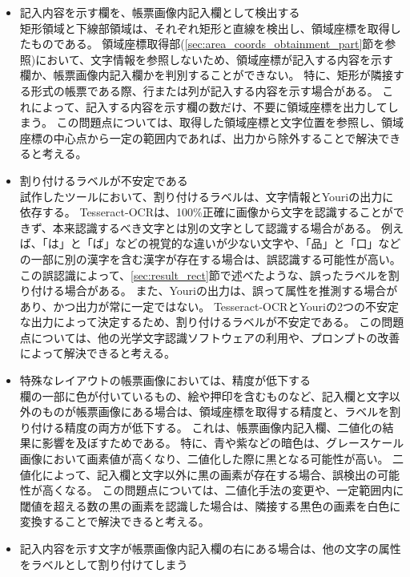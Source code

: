 \begin{itemize}
    \item 記入内容を示す欄を、帳票画像内記入欄として検出する\\
        矩形領域と下線部領域は、それぞれ矩形と直線を検出し、領域座標を取得したものである。
        領域座標取得部(\ref{sec:area_coords_obtainment_part}節を参照)において、文字情報を参照しないため、領域座標が記入する内容を示す欄か、帳票画像内記入欄かを判別することができない。
        特に、矩形が隣接する形式の帳票である際、行または列が記入する内容を示す場合がある。
        これによって、記入する内容を示す欄の数だけ、不要に領域座標を出力してしまう。
        この問題点については、取得した領域座標と文字位置を参照し、領域座標の中心点から一定の範囲内であれば、出力から除外することで解決できると考える。
    \item 割り付けるラベルが不安定である\\
        試作したツールにおいて、割り付けるラベルは、文字情報とYouriの出力に依存する。
        Tesseract-OCRは、100\%正確に画像から文字を認識することができず、本来認識するべき文字とは別の文字として認識する場合がある。
        例えば、「は」と「ば」などの視覚的な違いが少ない文字や、「品」と「口」などの一部に別の漢字を含む漢字が存在する場合は、誤認識する可能性が高い。
        この誤認識によって、\ref{sec:result_rect}節で述べたような、誤ったラベルを割り付ける場合がある。
        また、Youriの出力は、誤って属性を推測する場合があり、かつ出力が常に一定ではない。
        Tesseract-OCRとYouriの2つの不安定な出力によって決定するため、割り付けるラベルが不安定である。
        この問題点については、他の光学文字認識ソフトウェアの利用や、プロンプトの改善によって解決できると考える。
    \item 特殊なレイアウトの帳票画像においては、精度が低下する\\
        欄の一部に色が付いているもの、絵や押印を含むものなど、記入欄と文字以外のものが帳票画像にある場合は、領域座標を取得する精度と、ラベルを割り付ける精度の両方が低下する。
        これは、帳票画像内記入欄、二値化の結果に影響を及ぼすためである。
        特に、青や紫などの暗色は、グレースケール画像において画素値が高くなり、二値化した際に黒となる可能性が高い。
        二値化によって、記入欄と文字以外に黒の画素が存在する場合、誤検出の可能性が高くなる。
        この問題点については、二値化手法の変更や、一定範囲内に閾値を超える数の黒の画素を認識した場合は、隣接する黒色の画素を白色に変換することで解決できると考える。
    \item 記入内容を示す文字が帳票画像内記入欄の右にある場合は、他の文字の属性をラベルとして割り付けてしまう\\

\end{itemize}
